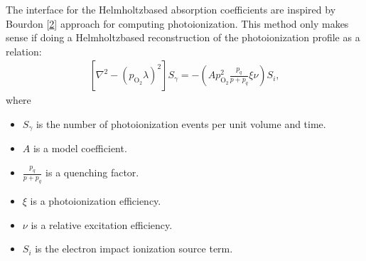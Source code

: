 \documentclass[letterpaper,10pt,english]{sphinxmanual}
\begin{document}
\sphinxAtStartPar
{}

\sphinxAtStartPar
The interface for the Helmholtz\sphinxhyphen{}based absorption coefficients are inspired by Bourdon  {[}\hyperlink{cite.ZZReferences:id12}{2}{]} approach for computing photoionization.
This method only makes sense if doing a Helmholtz\sphinxhyphen{}based reconstruction of the photoionization profile as a relation:
\begin{equation*}
\begin{split}\left[\nabla^2 - \left(p_{\textrm{O}_2} \lambda\right)^2\right]S_\gamma = -\left(A p_{\textrm{O}_2}^2\frac{p_q}{p + p_q}\xi\nu\right)S_i,\end{split}
\end{equation*}
\sphinxAtStartPar
where
\begin{itemize}
\item {} 
\sphinxAtStartPar
\(S_\gamma\) is the number of photoionization events per unit volume and time.

\item {} 
\sphinxAtStartPar
\(A\) is a model coefficient.

\item {} 
\sphinxAtStartPar
\(\frac{p_q}{p + p_q}\) is a quenching factor.

\item {} 
\sphinxAtStartPar
\(\xi\) is a photoionization efficiency.

\item {} 
\sphinxAtStartPar
\(\nu\) is a relative excitation efficiency.

\item {} 
\sphinxAtStartPar
\(S_i\) is the electron impact ionization source term.

\end{itemize}
\end{document}
